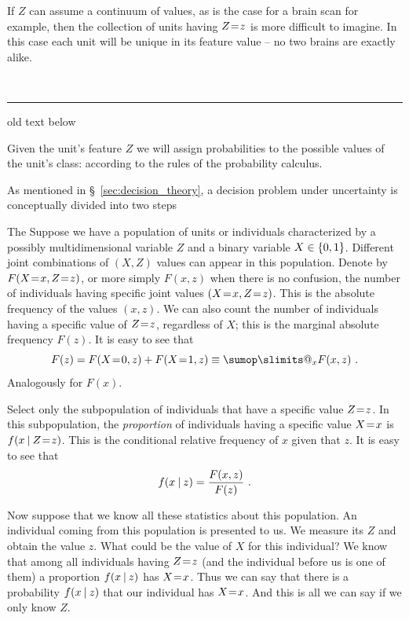 \documentclass[\ifafour a4paper,12pt,\else a5paper,10pt,\fi%
onecolumn,oneside,article,%
british%
]{memoir}
\makeatletter
\theoremstyle{remark}
\theoremstyle{innote}
\def\sum{\DOTSI\sumop\slimits@}
\newcommand*{\wrench}{{\fontencoding{U}\fontfamily{fontawesomethree}\selectfont\symbol{114}}}
\newcommand{\mynotew}[1]{{\footnotesize\color{notecolour}\wrench\ #1}}
\DeclarePairedDelimiter\set{\{}{\}} %
\renewcommand*{\|}[1][]{\nonscript\:#1\vert\nonscript\:\mathopen{}}
\newcommand*{\mo}[1][=]{\mathrel{\mkern-3.5mu#1\mkern-3.5mu}}
\newcommand*{\sect}{\S}%
\makeatother
\begin{document}
If $Z$ can assume a continuum of values, as is the case for a brain scan for example, then the collection of units having $Z\mo z$ is more difficult to imagine. In this case each unit will be unique in its feature value -- no two brains are exactly alike.




\mynotew{\medskip\hrule old text below}

Given the unit's feature $Z$ we will assign probabilities to the possible values of the unit's class:  according to the rules of the probability calculus.

As mentioned in \sect~\ref{sec:decision_theory}, a decision problem under uncertainty is conceptually divided into two steps 

The Suppose we have a population of units or individuals characterized by a possibly multidimensional variable $Z$ and a binary variable $X \in \set{0,1}$. Different joint combinations of $(X,Z)$ values can appear in this population. Denote by $F(X\mo x, Z\mo z)$, or more simply $F(x, z)$ when there is no confusion, the number of individuals having specific joint values $(X\mo x, Z\mo z)$. This is the absolute frequency of the values $(x,z)$. We can also count the number of individuals having a specific value of $Z\mo z$, regardless of $X$; this is the marginal absolute frequency $F(z)$. It is easy to see that
\begin{equation}
  \label{eq:marginal_prob}
  F(z) = F(X\mo 0, z) + F(X\mo 1, z) \equiv \sum_{x} F(x,z)\ .
\end{equation}
Analogously for $F(x)$.

Select only the subpopulation of individuals that have a specific value $Z\mo z$. In this subpopulation, the \emph{proportion} of individuals having a specific value $X\mo x$ is $f(x\| Z\mo z)$. This is the conditional relative frequency of $x$ given that $z$. It is easy to see that
\begin{equation}
  \label{eq:cond_prob}
  f(x \| z) = \frac{F(x,z)}{F(z)} \ .
\end{equation}

Now suppose that we know all these statistics about this population. An
individual coming from this population is presented to us. We measure its
$Z$ and obtain the value $z$. What could be the value of $X$ for this
individual? We know that among all individuals having $Z\mo z$ (and the
individual before us is one of them) a proportion $f(x \| z)$ has $X\mo x$.
Thus we can say that there is a probability $f(x \| z)$ that our individual
has $X\mo x$. And this is all we can say if we only know $Z$.
\end{document}
